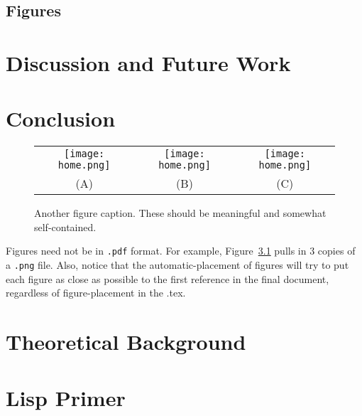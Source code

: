 \documentclass{ucl_thesis}
\begin{document}
\section{Figures} \label{sectionExample}


\chapter{Discussion and Future Work}
\label{chp:eval}
%





\chapter{Conclusion}
\label{chp:conc}
%

\begin{figure}
\begin{center}
\begin{tabular}{c|cc}   %
   \texttt{[image: home.png]} &  %
   \texttt{[image: home.png]} &  
   \texttt{[image: home.png]}\\
   (A) & (B) & (C)
\end{tabular}
\caption{Another figure caption. These should be meaningful and somewhat self-contained.} 
  \label{fig:SomeMoreFigs}
\end{center}
\end{figure}

Figures need not be in \texttt{.pdf} format. For example, Figure~\ref{fig:SomeMoreFigs} pulls in $3$ copies of a \texttt{.png} file. Also, notice that the automatic-placement of figures will try to put each figure as close as possible to the first reference in the final document, regardless of figure-placement in the .tex.






\cleardoublepage
\appendix
\chapter{Theoretical Background}
\label{chp:theory}
%

\chapter{Lisp Primer}
\label{cha:lisp-primer}








\end{document}

